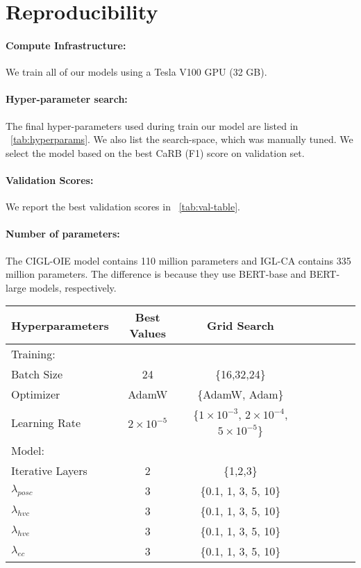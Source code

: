 \documentclass[11pt,a4paper]{article}
\newcommand{\shortname}{{\scshape IGL}}
\begin{document}
%
 
\section{Reproducibility}
\label{sec:reproducibility}

\paragraph{Compute Infrastructure:} We train all of our models using a Tesla V100 GPU (32 GB). 
\paragraph{Hyper-parameter search:}
The final hyper-parameters used during train our model are listed in \tablename~\ref{tab:hyperparams}. We also list the search-space, which was manually tuned. We select the model based on the best CaRB (F1) score on validation set. 
\paragraph{Validation Scores:} We report the best validation scores in \tablename~\ref{tab:val-table}.
\paragraph{Number of parameters:} The C\shortname-OIE model contains 110 million parameters and \shortname-CA contains 335 million parameters. The difference is because they use BERT-base and BERT-large models, respectively.

\begin{table*}
\centering
\begin{tabular}{lccccccc}
\toprule
Hyperparameters & Best Values & Grid Search \\
\midrule   
Training: \\
Batch Size & 24 & \{16,32,24\}\\
Optimizer & AdamW & \{AdamW, Adam\}\\
Learning Rate & $2\times10^{-5}$ & \{$1\times10^{-3}$, $2\times10^{-4}$, $5\times10^{-5}$\}\\
\midrule
Model: \\
Iterative Layers & 2 & \{1,2,3\} \\
$\lambda_{posc}$ & 3 & \{0.1, 1, 3, 5, 10\} \\
$\lambda_{hvc}$ & 3 & \{0.1, 1, 3, 5, 10\} \\
$\lambda_{hve}$ & 3 & \{0.1, 1, 3, 5, 10\} \\
$\lambda_{ec}$ & 3 & \{0.1, 1, 3, 5, 10\} \\
\bottomrule
\end{tabular}
\caption{Hyperparameter settings.}
\label{tab:hyperparams}
\end{table*}
\end{document}

